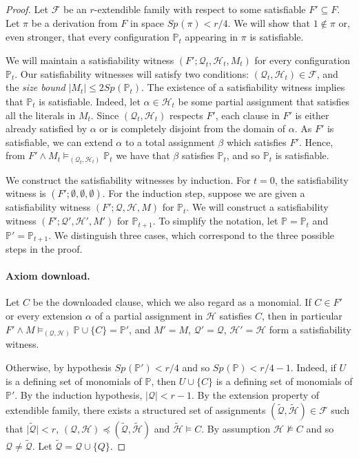 \documentclass[11pt]{article}
\numberwithin{equation}{section}
\theoremstyle{definition}
\theoremstyle{plain}
\theoremstyle{plain}
\theoremstyle{definition}
\newcommand{\set}[1]{\{ #1 \}}
\newcommand{\setsize}[1]{\lvert#1\rvert}
\newcommand{\union}{\cup}
\newcommand{\polynomialsetformat}[1]{\mathbb{#1}}
\newcommand{\pcsp}{\polynomialsetformat{P}}
\newcommand{\genericformsmall}[2]{\mathit{#1}( #2 )}
\newcommand{\mspaceof}[2][]{\genericformsmall{Sp_{#1}}{#2}}
\newcommand{\BGmodels}[2]{\models_{(#1,#2)}}
\newcommand{\partialmodels}{\BGmodels{\partitionnot}{\assignmentsetnot}}
\newcommand{\satwitness}[1][]{(F';\partitionnot #1, \assignmentsetnot #1, M #1)}
\newcommand{\kextendiblenot}{r}
\newcommand{\akextendible}{an \mbox{$\kextendiblenot$-ex}\-tend\-ible\xspace}
\newcommand{\kextendibleNok}{extendible\xspace}
\newcommand{\partitionnot}{\mathcal{Q}}
\newcommand{\assignmentsetnot}{\mathcal{H}}
\newcommand{\structuredassignmentsnot}[1][]{(\partitionnot #1,\assignmentsetnot #1)}
\newcommand{\kextendfamily}{\ensuremath{\mathcal{F}}\xspace}
\newcommand{\extensionproperty}{extension property\xspace}
\begin{document}
\begin{proof}
  Let $\kextendfamily$ be \akextendible family with respect to some satisfiable $F'\subseteq F$. Let $\pi$ be a derivation from $F$ in space $\mspaceof{\pi}< \kextendiblenot/4$. We will show that $1 \notin\pi$ or, even stronger, that every configuration $\pcsp_t$ appearing in $\pi$ is satisfiable.

  We will maintain a satisfiability witness $\satwitness[_t]$ for every configuration $\pcsp_t$. Our satisfiability witnesses will satisfy two conditions: $\structuredassignmentsnot[_t] \in \kextendfamily$, and the \emph{size bound} $\setsize{M_t} \leq 2\mspaceof{\pcsp_t}$. The existence of a satisfiability witness implies that $\pcsp_t$ is satisfiable. Indeed, let $\alpha \in \assignmentsetnot_t$ be some partial assignment that satisfies all the literals in $M_t$. Since $(\partitionnot_t,\assignmentsetnot_t)$ respects $F'$, each clause in $F'$ is either already satisfied by $\alpha$ or is completely disjoint from the domain of $\alpha$. As $F'$ is satisfiable, we can extend $\alpha$ to a total assignment $\beta$ which satisfies $F'$. Hence, from $F' \land M_t \BGmodels{\partitionnot_t}{\assignmentsetnot_t} \pcsp_t$ we have that $\beta$ satisfies $\pcsp_t$, and so $\pcsp_t$ is satisfiable.

  We construct the satisfiability witnesses by induction. For $t = 0$, the satisfiability witness is $(F';\emptyset,\emptyset,\emptyset)$. For the induction step, suppose we are given a satisfiability witness $(F';\partitionnot,\assignmentsetnot,M)$ for $\pcsp_t$. We will construct a satisfiability witness $(F';\partitionnot',\assignmentsetnot',M')$ for $\pcsp_{t+1}$. To simplify the notation, let $\pcsp=\pcsp_t$ and $\pcsp'=\pcsp_{t+1}$. We distinguish three cases, which correspond to the three possible steps in the proof.

%
%
%
\paragraph{Axiom download.} Let $C$ be the downloaded clause, which we also regard as a monomial. If $C\in F'$ or every extension $\alpha$ of a partial assignment in $\assignmentsetnot$ satisfies $C$, then in particular $F'\land M \partialmodels \pcsp\union\set{C}=\pcsp'$, and $M'=M$, $\partitionnot'=\partitionnot$, $\assignmentsetnot'=\assignmentsetnot$ form a satisfiability witness.

Otherwise, by hypothesis $\mspaceof{\mathbb{P'}}< \kextendiblenot/4$ and so $\mspaceof{\pcsp}<\kextendiblenot/4-1$. Indeed, if $U$ is a %
defining set of monomials
of $\pcsp$, then $U\union\set{C}$ is a %
defining set of monomials
of $\pcsp'$. By the induction hypothesis, $\setsize{\partitionnot}<\kextendiblenot-1$. By the \extensionproperty of \kextendibleNok family, there exists a structured set of assignments $(\tilde{\partitionnot},\tilde{\assignmentsetnot})\in\kextendfamily$ such that $\setsize{\tilde{\partitionnot}}< \kextendiblenot$, $\structuredassignmentsnot\preccurlyeq(\tilde{\partitionnot},\tilde{\assignmentsetnot})$ and $\tilde{\assignmentsetnot}\models C$. By assumption $\assignmentsetnot\not\models C$ and so $\partitionnot\neq\tilde{\partitionnot}$. Let $\tilde{\partitionnot} = \partitionnot \union \set{Q}$.


\end{proof}
\end{document}
